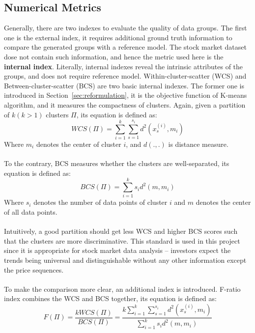 \subsection{Numerical Metrics}
\label{sec:metrics}
Generally, there are two indexes to evaluate the quality of data groups. The first one is the external index, it requires additional ground truth information to compare the generated groups with a reference model. The stock market dataset dose not contain such information, and hence the metric used here is the \textbf{internal index}. Literally, internal indexes reveal the intrinsic attributes of the groups, and does not require reference model. Within-cluster-scatter (WCS) and Between-cluster-scatter (BCS) are two basic internal indexes. The former one is introduced in Section~\ref{sec:reformulation}, it is the objective function of K-means algorithm, and it measures the compactness of clusters. Again, given a partition of $k (k>1)$ clusters $\Pi$, its equation is defined as:
\begin{equation}
    WCS(\Pi) = \sum_{i=1}^k \sum_{s=1}^{s_i} d^2(x_s^{(i)},m_i)
\end{equation}
Where $m_i$ denotes the center of cluster $i$, and $d(.,.)$ is distance measure.
\\\\To the contrary, BCS measures whether the clusters are well-separated, its equation is defined as:
\begin{equation}
    BCS(\Pi) = \sum_{i=1}^k s_i d^2(m,m_i)
    \label{eq:bcs}
\end{equation}
Where $s_i$ denotes the number of data points of cluster $i$ and $m$ denotes the center of all data points.
\\\\Intuitively, a good partition should get less WCS and higher BCS scores such that the clusters are more discriminative. This standard is used in this project since it is appropriate for stock market data analysis -- investors expect the trends being universal and distinguishable without any other information except the price sequences. 
\\\\To make the comparison more clear, an additional index is introduced. F-ratio index combines the WCS and BCS together, its equation is defined as:
\begin{equation}
    F(\Pi) = \frac{k WCS(\Pi)}{BCS(\Pi)} = \frac{k\sum_{i=1}^k \sum_{s=1}^{s_i} d^2(x_s^{(i)},m_i)}{\sum_{i=1}^k s_i d^2(m,m_i)}
    \label{eq:fratio}
\end{equation}
